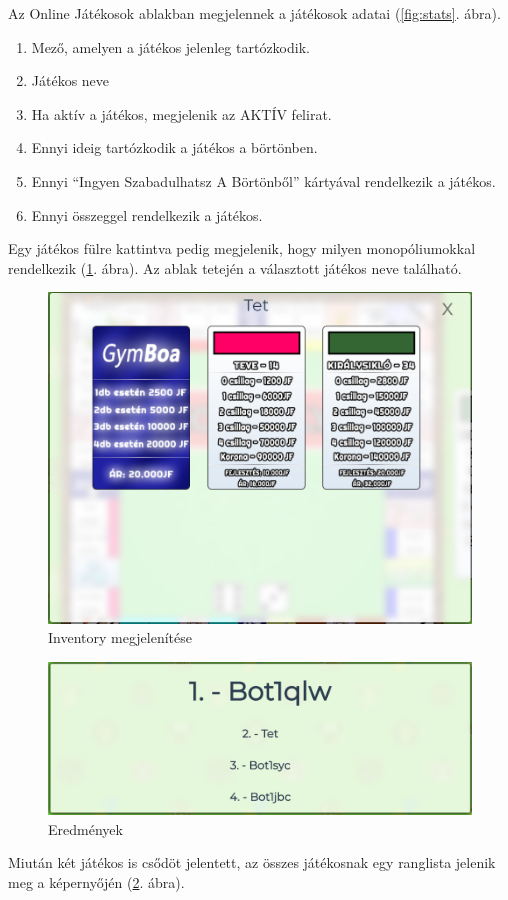 Az Online Játékosok ablakban megjelennek a játékosok adatai (\ref{fig:stats}. ábra).
\begin{enumerate}
	\item Mező, amelyen a játékos jelenleg tartózkodik.
	\item Játékos neve
	\item Ha aktív a játékos, megjelenik az AKTÍV felirat.
	\item Ennyi ideig tartózkodik a játékos a börtönben.
	\item Ennyi “Ingyen Szabadulhatsz A Börtönből” kártyával rendelkezik a játékos.
	\item Ennyi összeggel rendelkezik a játékos.
\end{enumerate}
\newpage
Egy játékos fülre kattintva pedig megjelenik, hogy milyen monopóliumokkal rendelkezik (\ref{fig:inventory}. ábra). Az ablak tetején a választott játékos neve található.

\begin{figure}[h!]
\centering
\includegraphics[scale=0.4]{images/ca07dc6cdaa3b06f2ed463e12650af68.png}
\caption{Inventory megjelenítése}
\label{fig:inventory}
\end{figure}


\begin{figure}[h!]
\centering
\includegraphics[scale=0.25]{images/ed4cc680904c8608d61522e3b3066dc1.png}
\caption{Eredmények}
\label{fig:endgame}
\end{figure}

Miután két játékos is csődöt jelentett, az összes játékosnak egy ranglista jelenik meg a képernyőjén (\ref{fig:endgame}. ábra).
